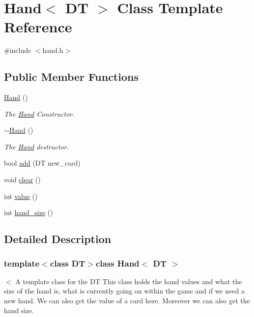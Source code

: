 \hypertarget{class_hand}{\section{Hand$<$ D\-T $>$ Class Template Reference}
\label{class_hand}
}


{\ttfamily \#include $<$hand.\-h$>$}

\subsection*{Public Member Functions}
\begin{DoxyCompactItemize}
\item 
\hyperlink{class_hand_ae3cef74a1e4a2cf45d630b347b923eae}{Hand} ()
\begin{DoxyCompactList}\small\item\em The \hyperlink{class_hand}{Hand} Constructor. \end{DoxyCompactList}\item 
\hyperlink{class_hand_a021a43d1a2eff97afed21395e70181e1}{$\sim$\-Hand} ()
\begin{DoxyCompactList}\small\item\em The \hyperlink{class_hand}{Hand} destructor. \end{DoxyCompactList}\item 
bool \hyperlink{class_hand_a912c20114230b88f5e578a899d7e75c6}{add} (D\-T new\-\_\-card)
\item 
void \hyperlink{class_hand_a665d8404a3b51991a0d0a0a3fc4c9a4e}{clear} ()
\item 
int \hyperlink{class_hand_a13520d75c81712f57a18c81322137b72}{value} ()
\item 
int \hyperlink{class_hand_a5e73744dfcbb49d33958702fa6b6da6a}{hand\-\_\-size} ()
\end{DoxyCompactItemize}


\subsection{Detailed Description}
\subsubsection*{template$<$class D\-T$>$class Hand$<$ D\-T $>$}

$<$ A template class for the D\-T This class holds the hand values and what the size of the hand is, what is currently going on within the game and if we need a new hand. We can also get the value of a card here. Moreover we can also get the hand size. 

